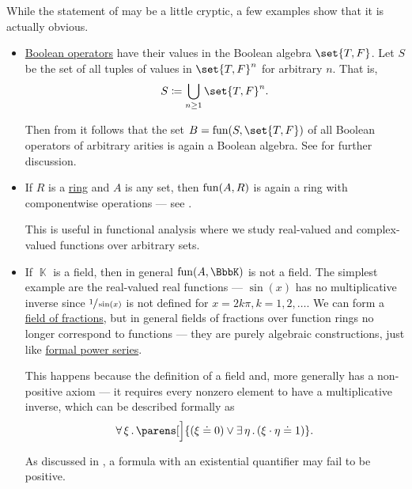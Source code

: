 \begin{example}\label{ex:thm:functions_over_model_of_positive_formulas_form_model}
  While the statement of  may be a little cryptic, a few examples show that it is actually obvious.
  \begin{itemize}
    \item \hyperref[def:boolean_operator]{Boolean operators} have their values in the Boolean algebra \( \set{ T, F } \). Let \( S \) be the set of all tuples of values in \( \set{ T, F }^n \) for arbitrary \( n \). That is,
    \begin{equation*}
      S \coloneqq \bigcup_{n \geq 1} \set{ T, F }^n.
    \end{equation*}

    Then from  it follows that the set \( B = \fun(S, \set{ T, F }) \) of all Boolean operators of arbitrary arities is again a Boolean algebra. See  for further discussion.

    \item If \( R \) is a \hyperref[def:ring]{ring} and \( A \) is any set, then \( \operatorname{fun}(A, R) \) is again a ring with componentwise operations --- see .

    This is useful in functional analysis where we study real-valued and complex-valued functions over arbitrary sets.

    \item If \( \BbbK \) is a field, then in general \( \fun(A, \BbbK) \) is not a field. The simplest example are the real-valued real functions --- \( \sin(x) \) has no multiplicative inverse since \( \sfrac 1 {\sin(x)} \) is not defined for \( x = 2k\pi, k = 1, 2, \ldots \). We can form a \hyperref[def:ring_localization]{field of fractions}, but in general fields of fractions over function rings no longer correspond to functions --- they are purely algebraic constructions, just like \hyperref[def:formal_power_series]{formal power series}.

    This happens because the definition of a field and, more generally has a non-positive axiom --- it requires every nonzero element to have a multiplicative inverse, which can be described formally as
    \begin{equation*}
      \qforall \xi \parens[\Big]{ (\xi \doteq 0) \vee \qexists \eta (\xi \cdot \eta \doteq 1) }.
    \end{equation*}

    As discussed in , a formula with an existential quantifier may fail to be positive.
  \end{itemize}
\end{example}

